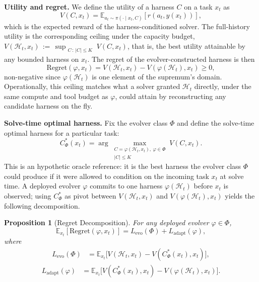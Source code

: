 \documentclass[11pt]{article}
\theoremstyle{plain}
\newtheorem{proposition}{Proposition}
\newcommand{\Levo}{L_{\text{evo}}}
\newcommand{\Ladapt}{L_{\text{adapt}}}
\newcommand{\Hist}{\mathcal{H}_t}
\begin{document}
\noindent\textbf{Utility and regret.}
We define the utility of a harness $C$ on a task $x_t$ as
\begin{equation}
\label{eq:utility}
V(C, x_t) = \mathbb{E}_{a_t \sim \pi(\cdot \mid x_t, C)}[r(a_t, y(x_t))],
\end{equation}
which is the expected reward of the harness-conditioned solver. The full-history utility is the corresponding ceiling under the capacity budget,
$V(\Hist, x_t) \,:=\, \sup_{\substack{C \,:\, |C| \leq K}} V(C, x_t)$,
that is, the best utility attainable by any bounded harness on $x_t$. The regret of the evolver-constructed harness is then
\begin{equation}
\label{eq:regret}
\text{Regret}(\varphi, x_t) = V(\Hist, x_t) - V(\varphi(\Hist), x_t) \geq 0,
\end{equation}
non-negative since $\varphi(\Hist)$ is one element of the supremum's domain. Operationally, this ceiling matches what a solver granted $\Hist$ directly, under the same compute and tool budget as $\varphi$, could attain by reconstructing any candidate harness on the fly.

\noindent\textbf{Solve-time optimal harness.}
Fix the evolver class $\Phi$ and define the solve-time optimal harness for a particular task:
\begin{equation}
\label{eq:cstar}
C^*_\Phi(x_t) = \arg\max_{\substack{C = \varphi(\Hist, x_t),\ \varphi \in \Phi \\ |C| \leq K}} V(C, x_t).
\end{equation}
This is an hypothetic oracle reference: it is the best harness the evolver class $\Phi$ could produce if it were allowed to condition on the incoming task $x_t$ at solve time. A deployed evolver $\varphi$ commits to one harness $\varphi(\Hist)$ before $x_t$ is observed; using $C^*_\Phi$ as pivot between $V(\Hist, x_t)$ and $V(\varphi(\Hist), x_t)$ yields the following decomposition.

\begin{proposition}[Regret Decomposition]
\label{prop:decomp}
For any deployed evolver $\varphi \in \Phi$,
\begin{equation}
\label{eq:decomp}
\mathbb{E}_{x_t}[\text{Regret}(\varphi, x_t)] = \Levo(\Phi) + \Ladapt(\varphi),
\end{equation}
where
\begin{align}
\label{eq:losses}
\Levo(\Phi) &= \mathbb{E}_{x_t}\!\bigl[V(\Hist, x_t) - V(C^*_\Phi(x_t), x_t)\bigr],
\end{align}
\begin{align}
\Ladapt(\varphi)  &= \mathbb{E}_{x_t}\!\bigl[V(C^*_\Phi(x_t), x_t) - V(\varphi(\Hist), x_t)\bigr].
\end{align}
\end{proposition}
\end{document}
